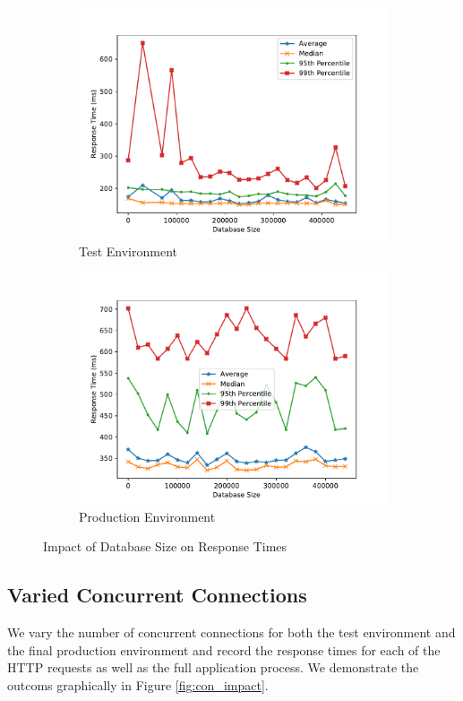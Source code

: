 \documentclass[sigconf,authordraft]{acmart}
\begin{document}
\begin{figure}
	\centering
	\begin{subfigure}{0.49\linewidth}
		\includegraphics[width=\linewidth]{test_db}
		\caption{Test Environment}
		\label{fig:test_db}
	\end{subfigure}
	\begin{subfigure}{0.49\linewidth}
		\includegraphics[width=\linewidth]{final_db}
		\caption{Production Environment}
		\label{fig:final_db}
	\end{subfigure}
\caption{Impact of Database Size on Response Times}
\label{fig:db_impact}
\end{figure}


\subsection{Varied Concurrent Connections}
We vary the number of concurrent connections for both the test environment and the final production environment and record the response times for each of the HTTP requests as well as the full application process. 
We demonstrate the outcoms graphically in Figure \ref{fig:con_impact}. 
\end{document}
